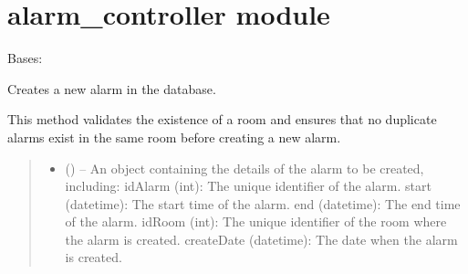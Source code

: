 \documentclass[letterpaper,10pt,english]{sphinxmanual}
\begin{document}
\section{alarm\_controller module}
\label{\detokenize{app.controllers:module-app.controllers.alarm_controller}}\label{\detokenize{app.controllers:alarm-controller-module}}

\begin{fulllineitems}
\label{\detokenize{app.controllers:app.controllers.alarm_controller.AlarmController}}
\pysigstartsignatures
\pysiglinewithargsret
{}
{}
{}
\pysigstopsignatures
\sphinxAtStartPar
Bases: 

\begin{fulllineitems}
\label{\detokenize{app.controllers:app.controllers.alarm_controller.AlarmController.create_alarm}}
\pysigstartsignatures
\pysiglinewithargsret
{}
{\sphinxparamcomma {}}
{}
\pysigstopsignatures
\sphinxAtStartPar
Creates a new alarm in the database.

\sphinxAtStartPar
This method validates the existence of a room and ensures that no duplicate
alarms exist in the same room before creating a new alarm.
\begin{quote}\begin{description}
\begin{itemize}
\item {} 
\sphinxAtStartPar
{} () – An object containing the details of the alarm to be created, including:
\sphinxhyphen{} idAlarm (int): The unique identifier of the alarm.
\sphinxhyphen{} start (datetime): The start time of the alarm.
\sphinxhyphen{} end (datetime): The end time of the alarm.
\sphinxhyphen{} idRoom (int): The unique identifier of the room where the alarm is created.
\sphinxhyphen{} createDate (datetime): The date when the alarm is created.


\end{itemize}
\end{description}
\end{quote}
\end{fulllineitems}
\end{fulllineitems}
\end{document}
